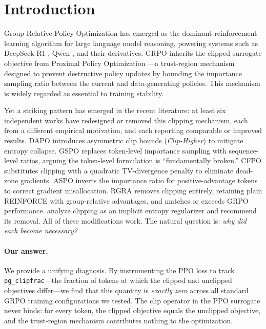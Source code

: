 
\section{Introduction}
\label{sec:introduction}

Group Relative Policy Optimization \citep[GRPO;][]{deepseekr1} has emerged as the dominant reinforcement learning algorithm for large language model reasoning, powering systems such as DeepSeek-R1 \citep{deepseekr1}, Qwen \citep{qwen2025}, and their derivatives.
GRPO inherits the clipped surrogate objective from Proximal Policy Optimization \citep[PPO;][]{schulman2017ppo}---a trust-region mechanism designed to prevent destructive policy updates by bounding the importance sampling ratio between the current and data-generating policies.
This mechanism is widely regarded as essential to training stability.

Yet a striking pattern has emerged in the recent literature: at least six independent works have redesigned or removed this clipping mechanism, each from a different empirical motivation, and each reporting comparable or improved results.
DAPO \citep{dapo2025} introduces asymmetric clip bounds (\emph{Clip-Higher}) to mitigate entropy collapse.
GSPO \citep{gspo2025} replaces token-level importance sampling with sequence-level ratios, arguing the token-level formulation is ``fundamentally broken.''
CFPO \citep{cfpo2025} substitutes clipping with a quadratic TV-divergence penalty to eliminate dead-zone gradients.
ASPO \citep{aspo2025} inverts the importance ratio for positive-advantage tokens to correct gradient misallocation.
RGRA \citep{rgra2025} removes clipping entirely, retaining plain REINFORCE with group-relative advantages, and matches or exceeds GRPO performance.
\citet{chen2025iclr} analyze clipping as an implicit entropy regularizer and recommend its removal.
All of these modifications work.
The natural question is: \emph{why did each become necessary?}

\paragraph{Our answer.}
We provide a unifying diagnosis.
By instrumenting the PPO loss to track \texttt{pg\_clipfrac}---the fraction of tokens at which the clipped and unclipped objectives differ---we find that this quantity is \emph{exactly zero} across all standard GRPO training configurations we tested.
The clip operator in the PPO surrogate never binds: for every token, the clipped objective equals the unclipped objective, and the trust-region mechanism contributes nothing to the optimization.


